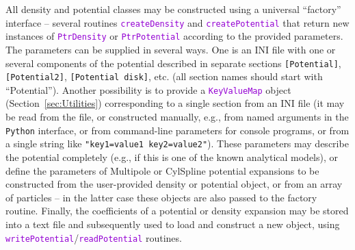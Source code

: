 \documentclass[12pt]{article}
\newcommand{\Python}{\texttt{Python}\xspace}
\newcommand{\ttt}[1]{\textcolor{darkviolet}{\texttt{#1}}}
\newcommand{\ppp}[1]{\textcolor{darkolive} {\texttt{#1}}}
\begin{document}
All density and potential classes may be constructed using a universal ``factory'' interface -- several routines \ttt{createDensity} and \ttt{createPotential} that return new instances of \ttt{PtrDensity} or \ttt{PtrPotential} according to the provided parameters.
The parameters can be supplied in several ways. One is an INI file with one or several components of the potential described in separate sections \ppp{[Potential]}, \ppp{[Potential2]}, \ppp{[Potential disk]}, etc. (all section names should start with ``Potential''). Another possibility is to provide a \ttt{KeyValueMap} object (Section~\ref{sec:Utilities}) corresponding to a single section from an INI file (it may be read from the file, or constructed manually, e.g., from named arguments in the \Python interface, or from command-line parameters for console programs, or from a single string like \ppp{"key1=value1 key2=value2"}). These parameters may describe the potential completely (e.g., if this is one of the known analytical models), or define the parameters of Multipole or CylSpline potential expansions to be constructed from the user-provided density or potential object, or from an array of particles -- in the latter case these objects are also passed to the factory routine. Finally, the coefficients of a potential or density expansion may be stored into a text file and subsequently used to load and construct a new object, using \ttt{writePotential}/\ttt{readPotential} routines.
\end{document}
